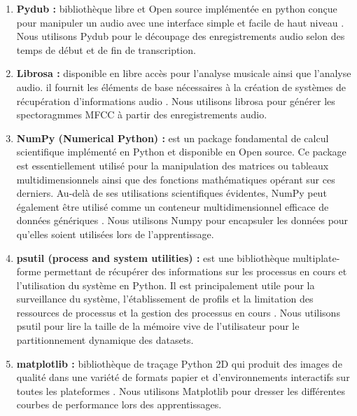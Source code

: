\begin{enumerate}
    \item \textbf{Pydub :} bibliothèque libre et Open source implémentée en python conçue pour manipuler un audio avec une interface simple et facile de haut niveau \cite{pydub}. Nous utilisons Pydub pour le découpage des enregistrements audio selon des temps de début et de fin de transcription. \\
    
    \item \textbf{Librosa :} disponible en libre accès pour l'analyse musicale ainsi que l'analyse audio. il fournit les éléments de base nécessaires à la création de systèmes de récupération d'informations audio \cite{librosa}. Nous utilisons librosa pour générer les spectoragmmes MFCC à partir des enregistrements audio.\\
    
    \item \textbf{NumPy (Numerical Python) :} est un package fondamental de calcul scientifique implémenté en Python et disponible en Open source. Ce package est essentiellement utilisé pour la manipulation des matrices ou tableaux multidimensionnels ainsi que des fonctions mathématiques opérant sur ces derniers. Au-delà de ses utilisations scientifiques évidentes, NumPy peut également être utilisé comme un conteneur multidimensionnel efficace de données génériques \cite{numpy}. Nous utilisons Numpy pour encapsuler les données pour qu'elles soient utilisées lors de l'apprentissage.\\
    
    \item \textbf{psutil (process and system utilities) :}  est une bibliothèque multiplate-forme permettant de récupérer des informations sur les processus en cours et l'utilisation du système en Python. Il est principalement utile pour la surveillance du système, l'établissement de profils et la limitation des ressources de processus et la gestion des processus en cours \cite{psutil}. Nous utilisons psutil pour lire la taille de la mémoire vive de l'utilisateur pour le partitionnement dynamique des datasets.\\
    
    \item \textbf{matplotlib :} bibliothèque de traçage Python 2D qui produit des images de qualité dans une variété de formats papier et d’environnements interactifs sur toutes les plateformes \cite{matplotlib}. Nous utilisons Matplotlib pour dresser les différentes courbes de performance lors des apprentissages. \\
    

\end{enumerate}
